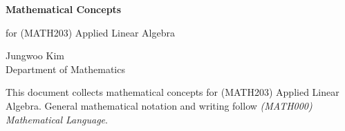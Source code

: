 \documentclass[11pt,oneside]{article}
\begin{document}
\thispagestyle{empty}

\begin{center}
    \vspace*{1.1cm}
    {\LARGE\bfseries Mathematical Concepts\par}
    \vspace{0.25cm}
    {\large for (MATH203) Applied Linear Algebra\par}
    \vspace{0.75cm}
    {\normalsize
    Jungwoo Kim\\
    Department of Mathematics\\
    \PohangUniversityOfScienceAndTechnology
    \par}
\end{center}

\vspace{0.45cm}

This document collects mathematical concepts for (MATH203) Applied Linear Algebra. General mathematical notation and writing follow \textit{(MATH000) Mathematical Language}.
\end{document}
